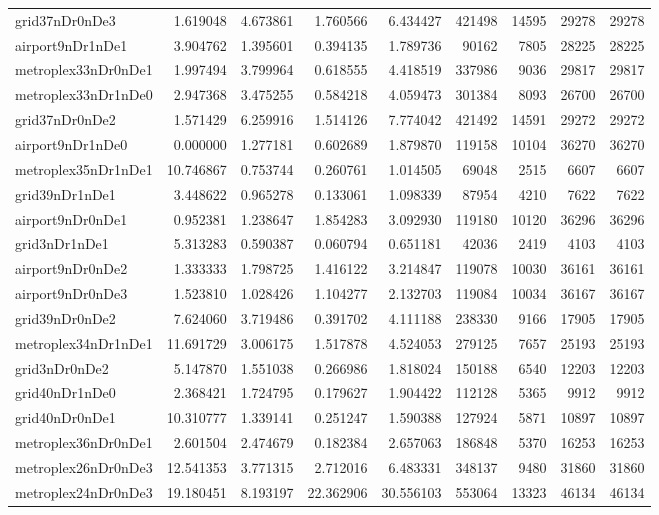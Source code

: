 \begin{longtable}{|l|r|r|r|r|r|r|r|r|}
grid37nDr0nDe3 & 1.619048 & 4.673861 & 1.760566 & 6.434427 & 421498 & 14595 & 29278 & 29278 \\
airport9nDr1nDe1 & 3.904762 & 1.395601 & 0.394135 & 1.789736 & 90162 & 7805 & 28225 & 28225 \\
metroplex33nDr0nDe1 & 1.997494 & 3.799964 & 0.618555 & 4.418519 & 337986 & 9036 & 29817 & 29817 \\
metroplex33nDr1nDe0 & 2.947368 & 3.475255 & 0.584218 & 4.059473 & 301384 & 8093 & 26700 & 26700 \\
grid37nDr0nDe2 & 1.571429 & 6.259916 & 1.514126 & 7.774042 & 421492 & 14591 & 29272 & 29272 \\
airport9nDr1nDe0 & 0.000000 & 1.277181 & 0.602689 & 1.879870 & 119158 & 10104 & 36270 & 36270 \\
metroplex35nDr1nDe1 & 10.746867 & 0.753744 & 0.260761 & 1.014505 & 69048 & 2515 & 6607 & 6607 \\
grid39nDr1nDe1 & 3.448622 & 0.965278 & 0.133061 & 1.098339 & 87954 & 4210 & 7622 & 7622 \\
airport9nDr0nDe1 & 0.952381 & 1.238647 & 1.854283 & 3.092930 & 119180 & 10120 & 36296 & 36296 \\
grid3nDr1nDe1 & 5.313283 & 0.590387 & 0.060794 & 0.651181 & 42036 & 2419 & 4103 & 4103 \\
airport9nDr0nDe2 & 1.333333 & 1.798725 & 1.416122 & 3.214847 & 119078 & 10030 & 36161 & 36161 \\
airport9nDr0nDe3 & 1.523810 & 1.028426 & 1.104277 & 2.132703 & 119084 & 10034 & 36167 & 36167 \\
grid39nDr0nDe2 & 7.624060 & 3.719486 & 0.391702 & 4.111188 & 238330 & 9166 & 17905 & 17905 \\
metroplex34nDr1nDe1 & 11.691729 & 3.006175 & 1.517878 & 4.524053 & 279125 & 7657 & 25193 & 25193 \\
grid3nDr0nDe2 & 5.147870 & 1.551038 & 0.266986 & 1.818024 & 150188 & 6540 & 12203 & 12203 \\
grid40nDr1nDe0 & 2.368421 & 1.724795 & 0.179627 & 1.904422 & 112128 & 5365 & 9912 & 9912 \\
grid40nDr0nDe1 & 10.310777 & 1.339141 & 0.251247 & 1.590388 & 127924 & 5871 & 10897 & 10897 \\
metroplex36nDr0nDe1 & 2.601504 & 2.474679 & 0.182384 & 2.657063 & 186848 & 5370 & 16253 & 16253 \\
metroplex26nDr0nDe3 & 12.541353 & 3.771315 & 2.712016 & 6.483331 & 348137 & 9480 & 31860 & 31860 \\
metroplex24nDr0nDe3 & 19.180451 & 8.193197 & 22.362906 & 30.556103 & 553064 & 13323 & 46134 & 46134 \\

\end{longtable}
